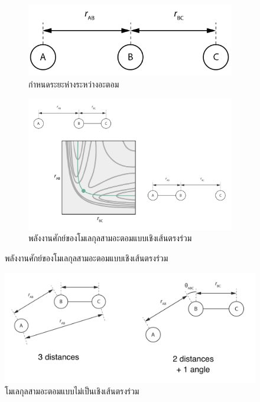 \begin{figure}[H]
    \centering
    \begin{subfigure}{0.5\textwidth}
        \centering
        \includegraphics[width=0.9\linewidth]{fig/3-body_collinear.png}
        \caption{กำหนดระยะห่างระหว่างอะตอม}
        \label{fig:3_body_mol}
    \end{subfigure}%
    \begin{subfigure}{0.5\textwidth}
        \centering
        \includegraphics[width=0.9\linewidth]{fig/3-body_collinear_PES.png}
        \caption{พลังงานศักย์ของโมเลกุลสามอะตอมแบบเชิงเส้นตรงร่วม}
        \label{fig:PES_3_body_mol}
    \end{subfigure}
    \label{fig:3_body_mol_and_PES}
\end{figure}

\begin{figure}[H]
    \centering
    \includegraphics[width=0.8\linewidth]{fig/3-body_non-collinear.png}
    \caption{โมเลกุลสามอะตอมแบบไม่เป็นเชิงเส้นตรงร่วม}
    \label{fig:non_collinear}
\end{figure}

